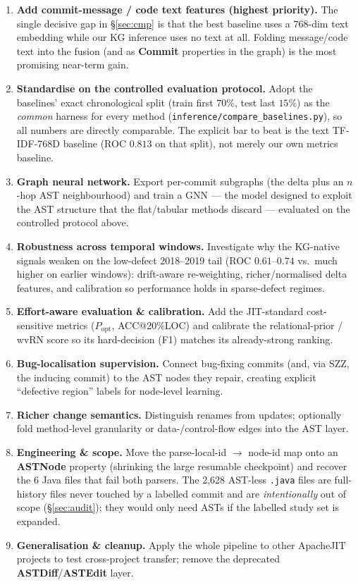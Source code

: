 \documentclass[11pt,a4paper]{article}
\newcommand{\node}[1]{\textcolor{kgblue}{\textbf{#1}}}
\begin{document}
\begin{enumerate}[nosep]
  \item \textbf{Add commit-message / code text features (highest priority).} The
        single decisive gap in \S\ref{sec:cmp} is that the best baseline uses a
        $768$-dim text embedding while our KG inference uses no text at all.
        Folding message/code text into the fusion (and as \node{Commit}
        properties in the graph) is the most promising near-term gain.
  \item \textbf{Standardise on the controlled evaluation protocol.} Adopt the
        baselines' exact chronological split (train first $70\%$, test last
        $15\%$) as the \emph{common} harness for every method
        (\texttt{inference/compare\_baselines.py}), so all numbers are directly
        comparable. The explicit bar to beat is the text TF-IDF-768D baseline
        (ROC $0.813$ on that split), not merely our own metrics baseline.
  \item \textbf{Graph neural network.} Export per-commit subgraphs (the delta
        plus an $n$-hop AST neighbourhood) and train a GNN --- the model designed
        to exploit the AST structure that the flat/tabular methods discard ---
        evaluated on the controlled protocol above.
  \item \textbf{Robustness across temporal windows.} Investigate why the
        KG-native signals weaken on the low-defect 2018--2019 tail (ROC
        $0.61$--$0.74$ vs.\ much higher on earlier windows): drift-aware
        re-weighting, richer/normalised delta features, and calibration so
        performance holds in sparse-defect regimes.
  \item \textbf{Effort-aware evaluation \& calibration.} Add the JIT-standard
        cost-sensitive metrics ($P_{\text{opt}}$, ACC@20\%LOC) and calibrate the
        relational-prior / wvRN score so its hard-decision (F1) matches its
        already-strong ranking.
  \item \textbf{Bug-localisation supervision.} Connect bug-fixing commits (and,
        via SZZ, the inducing commit) to the AST nodes they repair, creating
        explicit ``defective region'' labels for node-level learning.
  \item \textbf{Richer change semantics.} Distinguish renames from updates;
        optionally fold method-level granularity or data-/control-flow edges into
        the AST layer.
  \item \textbf{Engineering \& scope.} Move the parse-local-id $\rightarrow$
        node-id map onto an \node{ASTNode} property (shrinking the large resumable
        checkpoint) and recover the 6 Java files that fail both parsers. The
        2{,}628 AST-less \texttt{.java} files are full-history files never touched
        by a labelled commit and are \emph{intentionally} out of scope
        (\S\ref{sec:audit}); they would only need ASTs if the labelled study set
        is expanded.
  \item \textbf{Generalisation \& cleanup.} Apply the whole pipeline to other
        ApacheJIT projects to test cross-project transfer; remove the deprecated
        \node{ASTDiff}/\node{ASTEdit} layer.
\end{enumerate}
\end{document}
